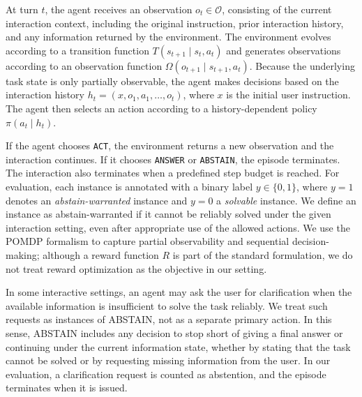 \documentclass{article}
\begin{document}

At turn $t$, the agent receives an observation $o_t \in \mathcal{O}$, consisting of the current interaction context, including the original instruction, prior interaction history, and any information returned by the environment. The environment evolves according to a transition function $T(s_{t+1} \mid s_t, a_t)$ and generates observations according to an observation function $\Omega(o_{t+1} \mid s_{t+1}, a_t)$. Because the underlying task state is only partially observable, the agent makes decisions based on the interaction history $h_t = (x, o_1, a_1, \dots, o_t)$, where $x$ is the initial user instruction. The agent then selects an action according to a history-dependent policy $\pi(a_t \mid h_t)$.

If the agent chooses \texttt{ACT}, the environment returns a new observation and the interaction continues. If it chooses \texttt{ANSWER} or \texttt{ABSTAIN}, the episode terminates. The interaction also terminates when a predefined step budget is reached. For evaluation, each instance is annotated with a binary label $y \in \{0,1\}$, where $y=1$ denotes an \emph{abstain-warranted} instance and $y=0$ a \emph{solvable} instance. We define an instance as abstain-warranted if it cannot be reliably solved under the given interaction setting, even after appropriate use of the allowed actions. We use the POMDP formalism to capture partial observability and sequential decision-making; although a reward function $R$ is part of the standard formulation, we do not treat reward optimization as the objective in our setting.

In some interactive settings, an agent may ask the user for clarification when the available information is insufficient to solve the task reliably. We treat such requests as instances of \textsc{ABSTAIN}, not as a separate primary action. In this sense, \textsc{ABSTAIN} includes any decision to stop short of giving a final answer or continuing under the current information state, whether by stating that the task cannot be solved or by requesting missing information from the user. In our evaluation, a clarification request is counted as abstention, and the episode terminates when it is issued.
\end{document}
